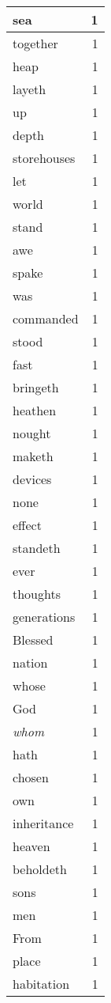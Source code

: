 \begin{center}
\begin{longtable}{l|r}
sea & 1 \\ \hline
together & 1 \\ \hline
heap & 1 \\ \hline
layeth & 1 \\ \hline
up & 1 \\ \hline
depth & 1 \\ \hline
storehouses & 1 \\ \hline
let & 1 \\ \hline
world & 1 \\ \hline
stand & 1 \\ \hline
awe & 1 \\ \hline
spake & 1 \\ \hline
was & 1 \\ \hline
commanded & 1 \\ \hline
stood & 1 \\ \hline
fast & 1 \\ \hline
bringeth & 1 \\ \hline
heathen & 1 \\ \hline
nought & 1 \\ \hline
maketh & 1 \\ \hline
devices & 1 \\ \hline
none & 1 \\ \hline
effect & 1 \\ \hline
standeth & 1 \\ \hline
ever & 1 \\ \hline
thoughts & 1 \\ \hline
generations & 1 \\ \hline
Blessed & 1 \\ \hline
nation & 1 \\ \hline
whose & 1 \\ \hline
God & 1 \\ \hline
\emph{whom} & 1 \\ \hline
hath & 1 \\ \hline
chosen & 1 \\ \hline
own & 1 \\ \hline
inheritance & 1 \\ \hline
heaven & 1 \\ \hline
beholdeth & 1 \\ \hline
sons & 1 \\ \hline
men & 1 \\ \hline
From & 1 \\ \hline
place & 1 \\ \hline
habitation & 1 \\ \hline

\end{longtable}
\end{center}
